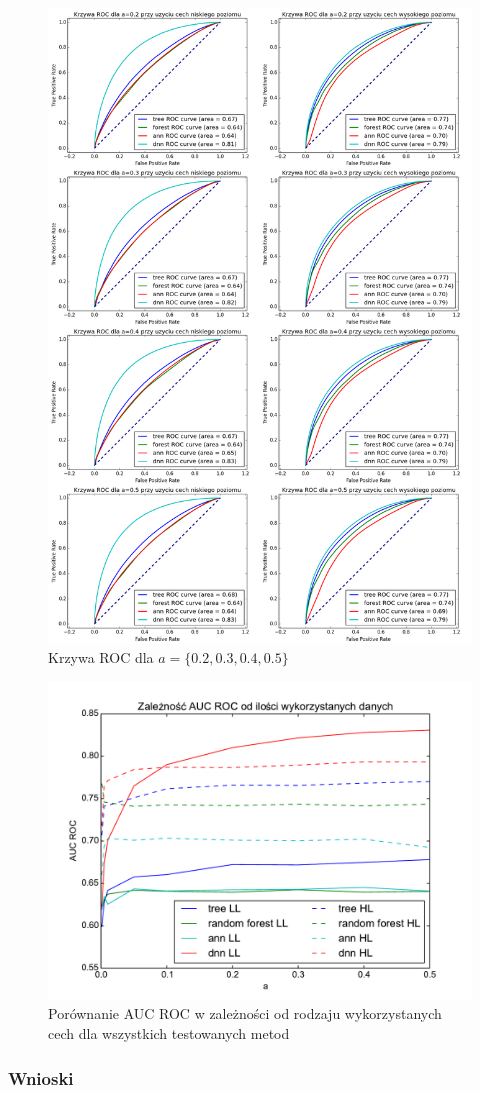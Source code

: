 \begin{figure}[ht!]
\centering
\includegraphics[scale=0.3]{res/all2.png}
\caption[Caption for LOF]{Krzywa ROC dla $a=\{0.2, 0.3, 0.4, 0.5\}$\label{higgsall2}}
\end{figure} 

\begin{figure}[ht!]
\centering
\includegraphics[scale=0.8]{res/higgssummary.pdf}
\caption[Caption for LOF]{Porównanie AUC ROC w zależności od rodzaju wykorzystanych cech dla wszystkich testowanych metod\label{higgssummary}}
\end{figure} 

\subsubsection{Wnioski}

